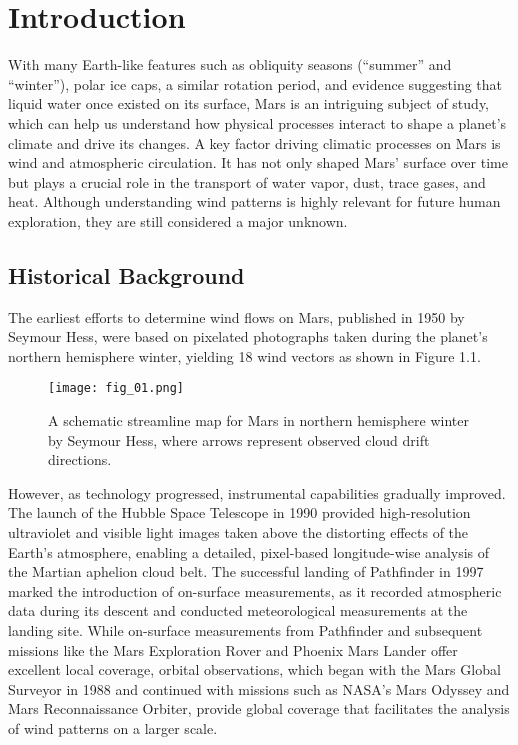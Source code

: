 \chapter{Introduction\label{chap:introduction}}

With many Earth-like features such as obliquity seasons (“summer” and “winter”), polar ice caps, a similar rotation period, and evidence suggesting that liquid water once existed on its surface\cite{clancyetalChapter022017}, Mars is an intriguing subject of study, which can help us understand how physical processes interact to shape a planet’s climate and drive its changes\cite{Leovy1978}. A key factor driving climatic processes on Mars is wind and atmospheric circulation. It has not only shaped Mars' surface over time but plays a crucial role in the transport of water vapor, dust, trace gases, and heat. Although understanding wind patterns is highly relevant for future human exploration, they are still considered a major unknown\cite{Guzewich2021}.

\section{Historical Background}

The earliest efforts to determine wind flows on Mars, published in 1950 by Seymour Hess, were based on pixelated photographs taken during the planet's northern hemisphere winter, yielding 18 wind vectors as shown in Figure 1.1\cite{Seymour1950}. 
\FloatBarrier
\begin{figure}[h!] 
    \centering
    \texttt{[image: fig\_01.png]}
    \caption{A schematic streamline map for Mars in northern hemisphere winter by Seymour Hess, where arrows represent observed cloud drift directions\cite{Seymour1950}. }
\end{figure}
\FloatBarrier
However, as technology progressed, instrumental capabilities gradually improved. The launch of the Hubble Space Telescope in 1990 provided high-resolution ultraviolet and visible light images taken above the distorting effects of the Earth’s atmosphere\cite{Uri2020}, enabling a detailed, pixel-based longitude-wise analysis of the Martian aphelion cloud belt\cite{Wolff1999}. The successful landing of Pathfinder in 1997 marked the introduction of on-surface measurements, as it recorded atmospheric data during its descent and conducted meteorological measurements at the landing site\cite{NasaMarsPathfinder}. While on-surface measurements from Pathfinder and subsequent missions like the Mars Exploration Rover and Phoenix Mars Lander offer excellent local coverage, orbital observations, which began with the Mars Global Surveyor in 1988 and continued with missions such as NASA's Mars Odyssey and Mars Reconnaissance Orbiter\cite{clancyetalChapter022017}, provide global coverage that facilitates the analysis of wind patterns on a larger scale.

